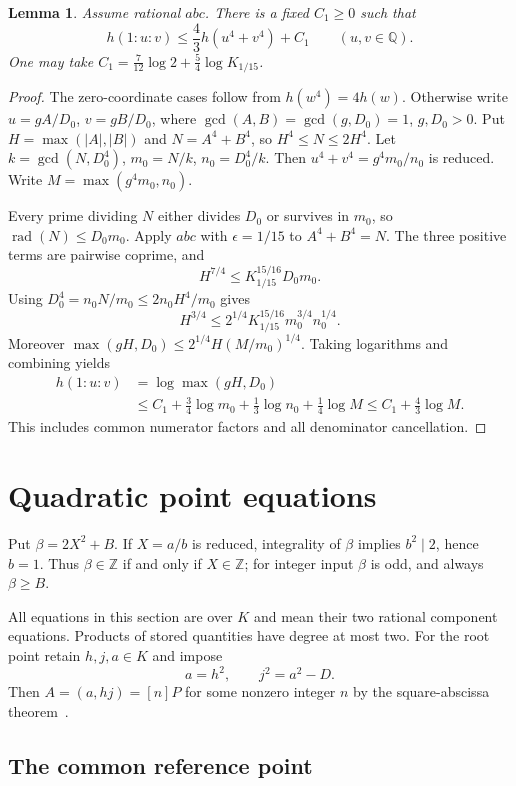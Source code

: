 \documentclass[11pt,a4paper]{article}
\newtheorem{lemma}[theorem]{Lemma}
\newcommand{\Q}{\mathbb Q}\newcommand{\Z}{\mathbb Z}
\DeclareMathOperator{\rad}{rad}
\begin{document}
\begin{lemma}\label{lem:pair}
Assume rational $abc$. There is a fixed $C_1\ge0$ such that
\[
                    h(1:u:v)\le\frac43h(u^4+v^4)+C_1
                    \qquad(u,v\in\Q).
\]
One may take $C_1=\frac7{12}\log2+\frac54\log K_{1/15}$.
\end{lemma}
\begin{proof}
The zero-coordinate cases follow from $h(w^4)=4h(w)$.
Otherwise write $u=gA/D_0$, $v=gB/D_0$, where
$\gcd(A,B)=\gcd(g,D_0)=1$, $g,D_0>0$. Put
$H=\max(|A|,|B|)$ and $N=A^4+B^4$, so $H^4\le N\le2H^4$.
Let $k=\gcd(N,D_0^4)$, $m_0=N/k$, $n_0=D_0^4/k$.
Then $u^4+v^4=g^4m_0/n_0$ is reduced. Write
$M=\max(g^4m_0,n_0)$.

Every prime dividing $N$ either divides $D_0$ or survives in $m_0$,
so $\rad(N)\le D_0m_0$. Apply $abc$ with $\epsilon=1/15$ to
$A^4+B^4=N$. The three positive terms are pairwise coprime, and
\[
 H^{7/4}\le K_{1/15}^{15/16}D_0m_0.
\]
Using $D_0^4=n_0N/m_0\le2n_0H^4/m_0$ gives
\[
 H^{3/4}\le2^{1/4}K_{1/15}^{15/16}m_0^{3/4}n_0^{1/4}.
\]
Moreover $\max(gH,D_0)\le2^{1/4}H(M/m_0)^{1/4}$.
Taking logarithms and combining yields
\[
 \begin{split}
 h(1:u:v)&=\log\max(gH,D_0)\\
 &\le C_1+\frac34\log m_0+\frac13\log n_0+\frac14\log M
 \le C_1+\frac43\log M.
 \end{split}
\]
This includes common numerator factors and all denominator cancellation.
\end{proof}

\section{Quadratic point equations}

Put $\beta=2X^2+B$. If $X=a/b$ is reduced, integrality of $\beta$
implies $b^2\mid2$, hence $b=1$. Thus $\beta\in\Z$ if and only if
$X\in\Z$; for integer input $\beta$ is odd, and always $\beta\ge B$.

All equations in this section are over $K$ and mean their two rational
component equations. Products of stored quantities have degree at most two.
For the root point retain $h,j,a\in K$ and impose
\begin{equation}\label{eq:root}
                       a=h^2,\qquad j^2=a^2-D.
\end{equation}
Then $A=(a,hj)=[n]P$ for some nonzero integer $n$ by the
square-abscissa theorem~\cite{Squares}. \subsection{The common reference point}
\end{document}
